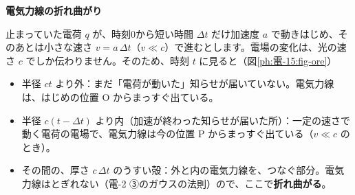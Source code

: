 \noindent\textbf{電気力線の折れ曲がり}\par\nobreak
止まっていた電荷 $q$ が、時刻0から短い時間 $\Delta t$ だけ加速度 $a$ で動きはじめ、そのあとは小さな速さ $v=a\,\Delta t$（$v\ll c$）で進むとします。電場の変化は、光の速さ $c$ でしか伝わりません。そのため、時刻 $t$ に見ると（図\ref{ph:電-15:fig-ore}）
\begin{itemize}[leftmargin=1.4\zw, itemsep=1pt, topsep=2pt, label={\color{bkTheme}●}]
\item 半径 $ct$ より外：まだ「電荷が動いた」知らせが届いていない。電気力線は、はじめの位置 O からまっすぐ出ている。
\item 半径 $c(t-\Delta t)$ より内（加速が終わった知らせが届いた所）：一定の速さで動く電荷の電場で、電気力線は今の位置 P からまっすぐ出ている（$v\ll c$ のとき）。
\item その間の、厚さ $c\,\Delta t$ のうすい殻：外と内の電気力線を、つなぐ部分。電気力線はとぎれない（電-2 ③のガウスの法則）ので、ここで\textbf{折れ曲がる}。
\end{itemize}

